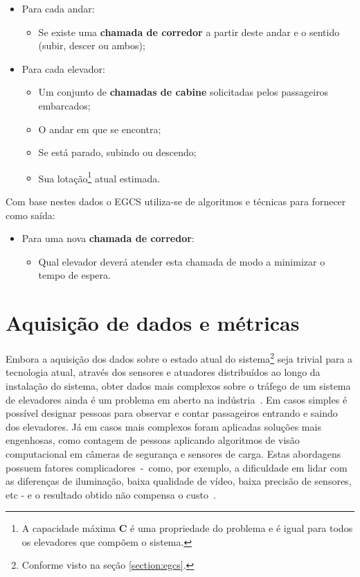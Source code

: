 \begin{itemize}
  \setlength\itemsep{0mm}
  \item Para cada andar:
  \begin{itemize}\setlength\itemsep{0mm}
    \item Se existe uma \textbf{chamada de corredor} a partir deste andar e o
          sentido (subir, descer ou ambos);
  \end{itemize}
  \item Para cada elevador:
  \begin{itemize}\setlength\itemsep{0mm}
    \item Um conjunto de \textbf{chamadas de cabine} solicitadas pelos
          passageiros embarcados;
    \item O andar em que se encontra;
    \item Se está parado, subindo ou descendo;
    \item Sua lotação\footnote{A capacidade máxima \textbf{C} é uma
          propriedade do problema e é igual para todos os elevadores que compõem
          o sistema.} atual estimada.
  \end{itemize}
\end{itemize}

Com base nestes dados o EGCS utiliza-se de algoritmos e técnicas para fornecer
como saída:

\begin{itemize}\setlength\itemsep{0mm}
  \item Para uma nova \textbf{chamada de corredor}:
  \begin{itemize}\setlength\itemsep{0mm}
    \item Qual elevador deverá atender esta chamada de modo a minimizar o tempo de espera.
  \end{itemize}
\end{itemize}

\section{\label{section:data}Aquisição de dados e métricas}

Embora a aquisição dos dados sobre o estado atual do sistema\footnote{Conforme
visto na seção \ref{section:egcs}.} seja trivial para a tecnologia atual,
através dos sensores e atuadores distribuídos ao longo da instalação do sistema,
obter dados mais complexos sobre o tráfego de um sistema de elevadores ainda é
um problema em aberto na indústria~\cite{KOEHLEROTTIGER02}. Em casos simples é
possível designar pessoas para observar e contar passageiros entrando e saindo
dos elevadores. Já em casos mais complexos foram aplicadas soluções mais
engenhosas, como contagem de pessoas aplicando algoritmos de visão computacional
em câmeras de segurança e sensores de carga. Estas abordagens possuem fatores
complicadores~-~como, por exemplo, a dificuldade em lidar com as diferenças de
iluminação, baixa qualidade de vídeo, baixa precisão de sensores, etc - e o
resultado obtido não compensa o custo~\cite{KOEHLEROTTIGER02}.

